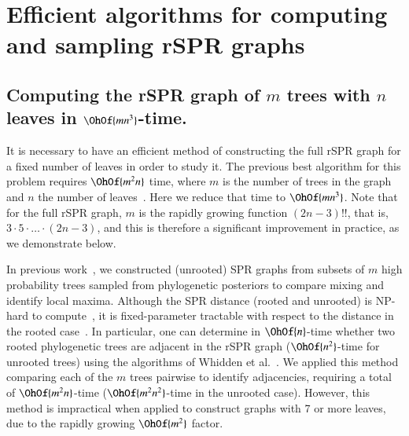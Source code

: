 \documentclass[]{elsarticle}
\begin{document}
\section{Efficient algorithms for computing and sampling rSPR graphs}

\subsection{Computing the rSPR graph of $m$ trees with $n$ leaves in $\OhOf{mn^3}$-time.}
\label{sec:computing_treespace}

It is necessary to have an efficient method of constructing the full rSPR graph for a fixed number of leaves in order to study it.
The previous best algorithm for this problem requires $\OhOf{m^2 n}$ time, where $m$ is the number of trees in the graph and $n$ the number of leaves~\citep{Whidden2015-yi}.
Here we reduce that time to $\OhOf{mn^3}$.
Note that for the full rSPR graph, $m$ is the rapidly growing function $(2n-3)!!$, that is, $3 \cdot 5 \cdot \ldots \cdot (2n-3)$, and this is therefore a significant improvement in practice, as we demonstrate below.

In previous work~\citep{Whidden2015-yi}, we constructed (unrooted) SPR graphs from subsets of $m$ high probability trees sampled from phylogenetic posteriors to compare mixing and identify local maxima.
Although the SPR distance (rooted and unrooted) is NP-hard to compute~\citep{bordewich05,hickey2008sdc}, it is fixed-parameter tractable with respect to the distance in the rooted case~\citep{bordewich05}.
In particular, one can determine in $\OhOf{n}$-time whether two rooted phylogenetic trees are adjacent in the rSPR graph ($\OhOf{n^2}$-time for unrooted trees) using the algorithms of Whidden et al.~\citep{whidden2009unifying,whidden2010fast, whidden2013hybridization,Whidden2015-yi}.
We applied this method comparing each of the $m$ trees pairwise to identify adjacencies, requiring a total of $\OhOf{m^2n}$-time ($\OhOf{m^2 n^2}$-time in the unrooted case).
However, this method is impractical when applied to construct graphs with 7 or more leaves, due to the rapidly growing $\OhOf{m^2}$ factor.
\end{document}
